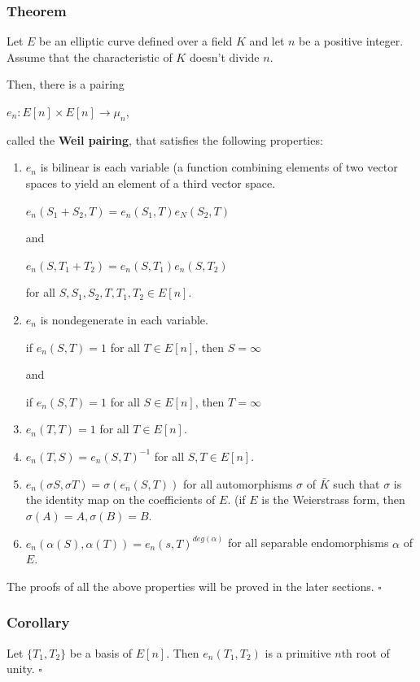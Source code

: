 \documentclass[a4paper, 12pt]{article}
\begin{document}
\subsubsection{Theorem}
Let $E$ be an elliptic curve defined over a field $K$ and let $n$ be a positive integer. Assume that the characteristic of $K$ doesn't divide $n$. \par Then, there is a pairing
\begin{center} $e_n: E[n] \times E[n] \rightarrow \mu_n$, \end{center}
called the \textbf{Weil pairing}, that satisfies the following properties:
\begin{enumerate}
	\item $e_n$ is bilinear is each variable \newline(a function combining elements of two vector spaces to yield an element of a third vector space.
	\begin{center} 
	$e_n(S_1+S_2,T) = e_n(S_1,T)e_N(S_2,T)$
	\end{center}
	and
	\begin{center}
	$e_n(S,T_1+T_2) = e_n(S,T_1)e_n(S,T_2)$
	\end{center}
	for all $S, S_1, S_2, T, T_1, T_2 \in E[n]$.
	\item $e_n$ is nondegenerate in each variable. 
	\begin{center} 
	if $e_n(S,T)=1$ for all $T \in E[n]$, then $S = \infty$\par
	and\par
	if $e_n(S,T)=1$ for all $S \in E[n]$, then $T= \infty$
	\end{center}
	\item $e_n(T,T)=1$ for all $T \in E[n]$.
	\item $e_n(T,S)=e_n(S,T)^{-1}$ for all $S,T \in E[n]$.
	\item $e_n(\sigma S, \sigma T) = \sigma(e_n(S,T))$ for all automorphisms $\sigma$ of $\bar{K}$ such that $\sigma$ is the identity map on the coefficients of $E$. (if $E$ is the Weierstrass form, then $\sigma(A) = A, \sigma(B)=B$.
	\item $e_n(\alpha(S),\alpha(T)) = e_n(s,T)^{deg(\alpha)}$ for all separable endomorphisms $\alpha$ of $E$. 
\end{enumerate}
The proofs of all the above properties will be proved in the later sections. $\square$\par
\subsubsection{Corollary}
Let $\{T_1,T_2\}$ be a basis of $E[n]$. Then $e_n(T_1,T_2)$ is a primitive $n$th root of unity. $\square$
\end{document}
